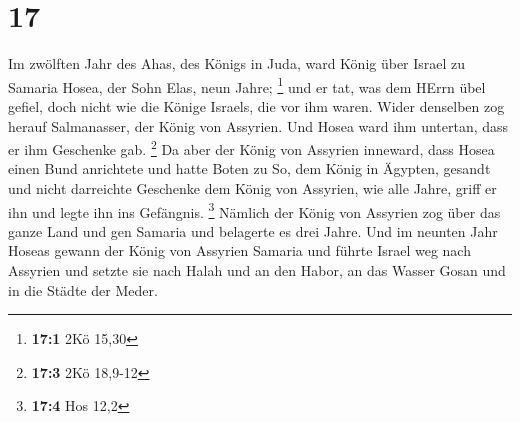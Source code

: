 \hypertarget{section-16}{%
\section{17}\label{section-16}}

 Im zwölften Jahr des Ahas, des Königs in Juda, ward König
über Israel zu Samaria Hosea, der Sohn Elas, neun Jahre; \footnote{\textbf{17:1}
  2Kö 15,30}  und er tat, was dem HErrn übel gefiel, doch
nicht wie die Könige Israels, die vor ihm waren.  Wider
denselben zog herauf Salmanasser, der König von Assyrien. Und Hosea ward
ihm untertan, dass er ihm Geschenke gab. \footnote{\textbf{17:3} 2Kö
  18,9-12}  Da aber der König von Assyrien inneward, dass
Hosea einen Bund anrichtete und hatte Boten zu So, dem König in Ägypten,
gesandt und nicht darreichte Geschenke dem König von Assyrien, wie alle
Jahre, griff er ihn und legte ihn ins Gefängnis. \footnote{\textbf{17:4}
  Hos 12,2}  Nämlich der König von Assyrien zog über das
ganze Land und gen Samaria und belagerte es drei Jahre. 
Und im neunten Jahr Hoseas gewann der König von Assyrien Samaria und
führte Israel weg nach Assyrien und setzte sie nach Halah und an den
Habor, an das Wasser Gosan und in die Städte der Meder.

